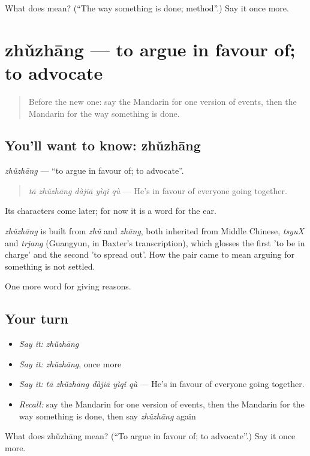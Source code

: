 \begin{tcolorbox}[breakable,colback=teal!4,colframe=teal!35!black,title={Before you move on}]
What does  mean? (\textquotedblleft{}The way something is done; method\textquotedblright{}.) Say it once more.
\end{tcolorbox}
\section[zhǔzhāng]{zhǔzhāng — to argue in favour of; to advocate}

\label{lesson:ZH-C349-zhuzhang}



\begin{quote}
Before the new one: say the Mandarin for one version of events, then the Mandarin for the way something is done.
\end{quote}

\subsection*{You'll want to know: zhǔzhāng}
\emph{zhǔzhāng} — \textquotedblleft{}to argue in favour of; to advocate\textquotedblright{}.

\begin{quote}
\emph{tā zhǔzhāng dàjiā yìqǐ qù} — He's in favour of everyone going together.
\end{quote}

Its characters come later; for now it is a word for the ear.

\begin{cousinweb}
\emph{zhǔzhāng} is built from \emph{zhǔ} and \emph{zhāng}, both inherited from Middle Chinese, \emph{tsyuX} and \emph{trjang} (Guangyun, in Baxter's transcription), which glosses the first 'to be in charge' and the second 'to spread out'. How the pair came to mean arguing for something is not settled.
\end{cousinweb}

\begin{grammarlens}[title={What you've built}]
One more word for giving reasons.
\end{grammarlens}

\subsection*{Your turn}
\begin{itemize}
\raggedright
  \item \emph{Say it:} \emph{zhǔzhāng}
  \item \emph{Say it:} \emph{zhǔzhāng}, once more
  \item \emph{Say it:} \emph{tā zhǔzhāng dàjiā yìqǐ qù} — He's in favour of everyone going together.
  \item \emph{Recall:} say the Mandarin for one version of events, then the Mandarin for the way something is done, then say \emph{zhǔzhāng} again
\end{itemize}

\begin{tcolorbox}[breakable,colback=teal!4,colframe=teal!35!black,title={Before you move on}]
What does zhǔzhāng mean? (\textquotedblleft{}To argue in favour of; to advocate\textquotedblright{}.) Say it once more.
\end{tcolorbox}

